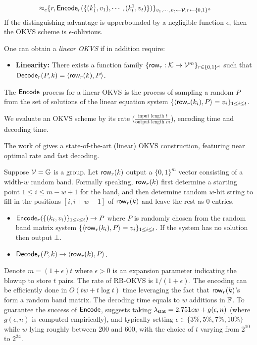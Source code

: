 \begin{definition}
\begin{itemize}[itemsep=5pt]
\begin{align*}
    \approx_c &\{r, {\sf Encode}_r(\{(k_1^1,v_1),\cdots,(k_t^1,v_t)\})\}_{v_1,\cdots,v_t\leftarrow \mathcal{V},r\leftarrow\{0,1\}^\kappa}
  \end{align*}
  If the distinguishing advantage is upperbounded by a negligible function $\epsilon$, then the OKVS scheme is $\epsilon$-oblivious. 
  \end{itemize}
One can obtain a \emph{linear OKVS} if in addition require:
\begin{itemize}
  \item \textbf{Linearity: }There exists a function family $\{{\sf row}_r:\mathcal{K}\rightarrow\mathcal{V}^m\}_{r\in\{0,1\}^\kappa}$ such that ${\sf Decode}_r(P,k) = \langle {\sf row}_r(k), P \rangle$. 
\end{itemize}
\end{definition}
The ${\sf Encode}$ process for a linear OKVS is the process of sampling a random $P$ from the set of solutions of the linear equation system $\{\langle {\sf row}_r(k_i), P \rangle = v_i\}_{1\le i\le t}$. 

We evaluate an OKVS scheme by its rate ($\frac{\text{input length }t}{\text{output length }m}$), encoding time and decoding time. 

The work of \cite{cryptoeprint:2023/903} gives a state-of-the-art (linear) OKVS construction, featuring near optimal rate and fast decoding. 

\begin{construction}\label{con:OKVS_ribbon}
  Suppose $\mathcal{V} = \mathbb{G}$ is a group. Let ${\sf row}_r(k)$ output a $\{0,1\}^m$ vector consisting of a width-$w$ random band. Formally speaking, ${\sf row}_r(k)$ first determine a starting point $1\le i\le m-w+1$ for the band, and then determine random $w$-bit string to fill in the positions $[i,i+w-1]$ of ${\sf row}_r(k)$ and leave the rest as 0 entries. 
  \begin{itemize}
    \item ${\sf Encode}_r(\{(k_i,v_i)\}_{1\le i\le t})\rightarrow P$ where $P$ is randomly chosen from the random band matrix system $\{\langle {\sf row}_r(k_i), P \rangle=v_i\}_{1\le i\le t}$. If the system has no solution then output $\bot$. 
    \item ${\sf Decode}_r(P,k)\rightarrow \langle {\sf row}_r(k), P \rangle$. 
  \end{itemize}
  
\end{construction}

Denote $m=(1+\epsilon)t$ where $\epsilon>0$ is an expansion parameter indicating the blowup to store $t$ pairs. The rate of RB-OKVS is $1/(1+\epsilon)$. The encoding can be efficiently done in $O(tw+t\log t)$ time leveraging the fact that ${\sf row}_r(k)$'s form a random band matrix. The decoding time equals to $w$ additions in $\mathbb{F}$. 
To guarantee the success of ${\sf Encode}$, \cite{cryptoeprint:2023/903} suggests taking $\lambda_{\sf stat} = 2.751\epsilon w+g(\epsilon,n)$ (where $g(\epsilon,n)$ is computed empirically), and typically setting $\epsilon\in\{3\%,5\%,7\%,10\%\}$ while $w$ lying roughly between 200 and 600, with the choice of $t$ varying from $2^{10}$ to $2^{24}$.
